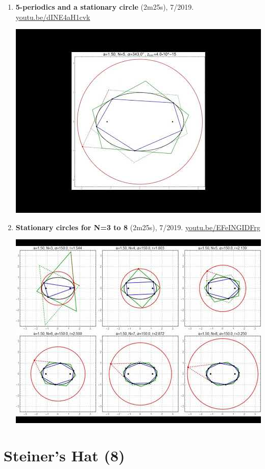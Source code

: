 \documentclass[12pt]{article}
\begin{document}
\begin{enumerate}[resume]
% 
\item \textbf{5-periodics and a stationary circle} (2m25s), 7/2019. \href{https://youtu.be/dINE4aH1cvk}{\url{youtu.be/dINE4aH1cvk}}
\begin{center}\includegraphics[width=.5\textwidth]{pics/dINE4aH1cvk.jpg}\end{center}
% 
\item \textbf{Stationary circles for N=3 to 8} (2m25s), 7/2019. \href{https://youtu.be/EFeINGIDFrg}{\url{youtu.be/EFeINGIDFrg}}
\begin{center}\includegraphics[width=.5\textwidth]{pics/EFeINGIDFrg.jpg}\end{center}
% 
\end{enumerate}

\section{Steiner's Hat (8)}
\end{document}
